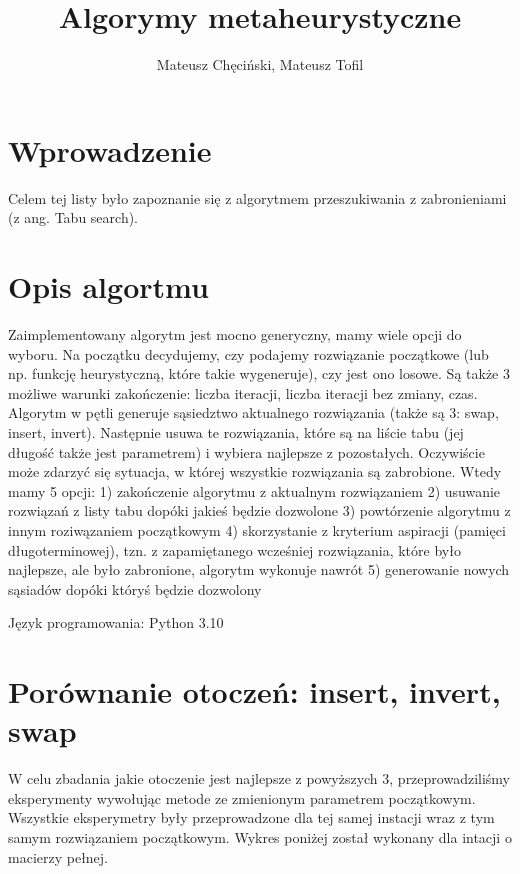 \documentclass{article}
\begin{document}
    \begin{titlepage}
        \title{Algorymy metaheurystyczne}
        \author{Mateusz Chęciński, Mateusz Tofil}
        \maketitle
    \end{titlepage}

    \section{Wprowadzenie}

    Celem tej listy było zapoznanie się z algorytmem przeszukiwania z
    zabronieniami (z ang. Tabu search). 

    \section{Opis algortmu}

   Zaimplementowany algorytm jest mocno generyczny, mamy wiele opcji do wyboru.
   Na początku decydujemy, czy podajemy rozwiązanie początkowe 
   (lub np. funkcję heurystyczną, które takie wygeneruje), czy jest 
   ono losowe. Są także 3 możliwe warunki zakończenie: 
   liczba iteracji, liczba iteracji bez zmiany, czas.
   Algorytm w pętli generuje sąsiedztwo aktualnego rozwiązania
   (także są 3: swap, insert, invert). Następnie usuwa te rozwiązania,
   które są na liście tabu (jej długość także jest parametrem) i wybiera
   najlepsze z pozostałych. Oczywiście może zdarzyć się sytuacja, w której
   wszystkie rozwiązania są zabrobione. Wtedy mamy 5 opcji: 
   1) zakończenie algorytmu z aktualnym rozwiązaniem
   2) usuwanie rozwiązań z listy tabu dopóki jakieś będzie dozwolone
   3) powtórzenie algorytmu z innym roziwązaniem początkowym
   4) skorzystanie z kryterium aspiracji (pamięci długoterminowej), tzn.
   z zapamiętanego wcześniej rozwiązania, które było najlepsze, ale było zabronione,
   algorytm wykonuje nawrót
   5) generowanie nowych sąsiadów dopóki któryś będzie dozwolony
    

    \noindent Język programowania: Python 3.10

    \section{Porównanie otoczeń: insert, invert, swap}

    W celu zbadania jakie otoczenie jest najlepsze z
    powyższych 3, przeprowadziliśmy eksperymenty wywołując
    metode ze zmienionym parametrem początkowym. Wszystkie
    eksperymetry były przeprowadzone dla tej samej instacji
    wraz z tym samym rozwiązaniem początkowym. Wykres poniżej
    został wykonany dla intacji o macierzy pełnej.
    
\end{document}
